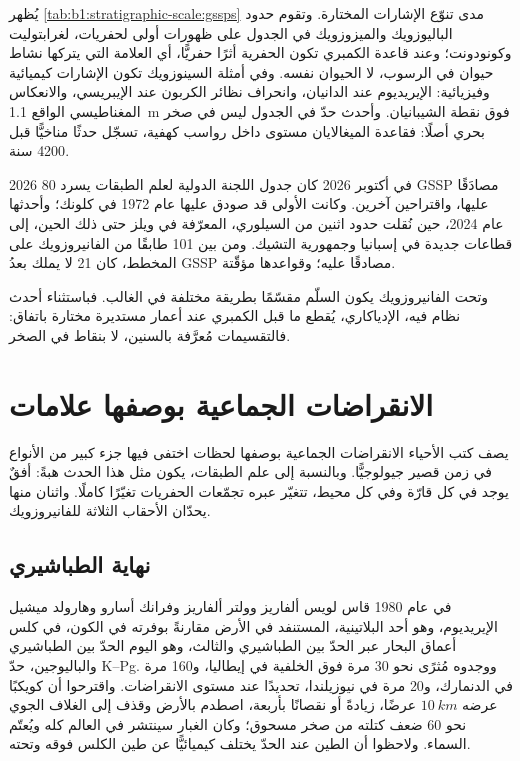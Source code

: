 يُظهر \cref{tab:b1:stratigraphic-scale:gssps} مدى تنوّع الإشارات المختارة. وتقوم حدود الباليوزويك والميزوزويك في الجدول على ظهورات أولى لحفريات، لغرابتوليت وكونودونت؛ وعند قاعدة الكمبري تكون الحفرية أثرًا حفريًّا، أي العلامة التي يتركها نشاط حيوان في الرسوب، لا الحيوان نفسه. وفي أمثلة السينوزويك تكون الإشارات كيميائية وفيزيائية: الإيريديوم عند الدانيان، وانحراف نظائر الكربون عند الإيبريسي، والانعكاس المغناطيسي الواقع \qty{1.1}{m} فوق نقطة الشيبانيان. وأحدث حدّ في الجدول ليس في صخر بحري أصلًا: فقاعدة الميغالايان مستوى داخل رواسب كهفية، تسجّل حدثًا مناخيًّا قبل 4200 سنة.

\begin{dated}{2026}
في أكتوبر 2026 كان جدول اللجنة الدولية لعلم الطبقات يسرد 80 GSSP مصادَقًا عليها، واقتراحين آخرين. وكانت الأولى قد صودق عليها عام 1972 في كلونك؛ وأحدثها عام 2024، حين نُقلت حدود اثنين من السيلوري، المعرّفة في ويلز حتى ذلك الحين، إلى قطاعات جديدة في إسبانيا وجمهورية التشيك. ومن بين \num{101} طابقًا من الفانيروزويك على المخطط، كان 21 لا يملك بعدُ GSSP مصادقًا عليه؛ وقواعدها مؤقّتة.
\end{dated}

وتحت الفانيروزويك يكون السلّم مقسّمًا بطريقة مختلفة في الغالب. فباستثناء أحدث نظام فيه، الإدياكاري، يُقطع ما قبل الكمبري عند أعمار مستديرة مختارة باتفاق: فالتقسيمات مُعرَّفة بالسنين، لا بنقاط في الصخر.

\section{الانقراضات الجماعية بوصفها علامات}\label{sec:b1:stratigraphic-scale:extinctions}

يصف كتب الأحياء الانقراضات الجماعية بوصفها لحظات اختفى فيها جزء كبير من الأنواع في زمن قصير جيولوجيًّا. وبالنسبة إلى علم الطبقات، يكون مثل هذا الحدث هبةً: أفقٌ يوجد في كل قارّة وفي كل محيط، تتغيّر عبره تجمّعات الحفريات تغيّرًا كاملًا. واثنان منها يحدّان الأحقاب الثلاثة للفانيروزويك.

\subsection*{نهاية الطباشيري}

في عام 1980 قاس لويس ألفاريز وولتر ألفاريز وفرانك أسارو وهارولد ميشيل الإيريديوم، وهو أحد  البلاتينية، المستنفد في  الأرض مقارنةً بوفرته في الكون، في كلس أعماق البحار عبر الحدّ بين الطباشيري والثالث، وهو اليوم الحدّ بين الطباشيري والباليوجين، حدّ K--Pg. ووجدوه مُثرًى نحو 30 مرة فوق الخلفية في إيطاليا، و\num{160} مرة في الدنمارك، و\num{20} مرة في نيوزيلندا، تحديدًا عند مستوى الانقراضات. واقترحوا أن كويكبًا عرضه $\qty{10}{km}$ عرضًا، زيادةً أو نقصانًا بأربعة، اصطدم بالأرض وقذف إلى الغلاف الجوي نحو 60 ضعف كتلته من صخر مسحوق؛ وكان الغبار سينتشر في العالم كله ويُعتّم السماء. ولاحظوا أن الطين عند الحدّ يختلف كيميائيًّا عن طين الكلس فوقه وتحته.


